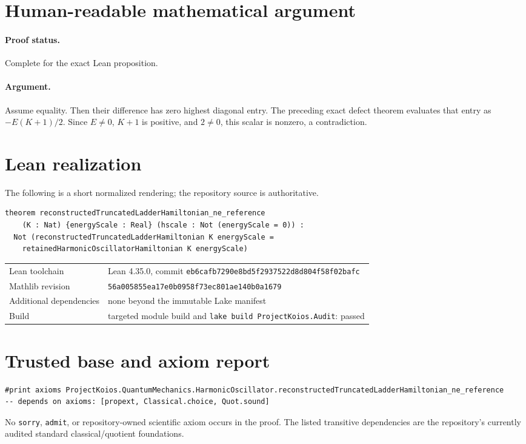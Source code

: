 \documentclass[11pt]{article}
\begin{document}
\section{Human-readable mathematical argument}
\paragraph{Proof status.} Complete for the exact Lean proposition.
\paragraph{Argument.} Assume equality.  Then their difference has zero highest diagonal entry.  The preceding exact defect theorem evaluates that entry as $-E(K+1)/2$.  Since $E\ne0$, $K+1$ is positive, and $2\ne0$, this scalar is nonzero, a contradiction.

\section{Lean realization}
The following is a short normalized rendering; the repository source is authoritative.
\begin{lstlisting}
theorem reconstructedTruncatedLadderHamiltonian_ne_reference
    (K : Nat) {energyScale : Real} (hscale : Not (energyScale = 0)) :
  Not (reconstructedTruncatedLadderHamiltonian K energyScale =
    retainedHarmonicOscillatorHamiltonian K energyScale)
\end{lstlisting}
\begin{tabularx}{\textwidth}{@{}lY@{}}\toprule
Lean toolchain & Lean 4.35.0, commit \texttt{eb6cafb7290e8bd5f2937522d8d804f58f02bafc} \\
Mathlib revision & \texttt{56a005855ea17e0b0958f73ec801ae140b0a1679} \\
Additional dependencies & none beyond the immutable Lake manifest \\
Build & targeted module build and \texttt{lake build ProjectKoios.Audit}: passed \\
\bottomrule\end{tabularx}

\section{Trusted base and axiom report}
\begin{lstlisting}
#print axioms ProjectKoios.QuantumMechanics.HarmonicOscillator.reconstructedTruncatedLadderHamiltonian_ne_reference
-- depends on axioms: [propext, Classical.choice, Quot.sound]
\end{lstlisting}
No \texttt{sorry}, \texttt{admit}, or repository-owned scientific axiom occurs in the
proof. The listed transitive dependencies are the repository's currently audited standard
classical/quotient foundations.
\end{document}

